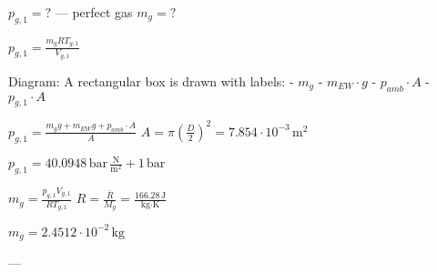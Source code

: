 \( p_{g,1} = ? \) — perfect gas  
\( m_g = ? \)  

\( p_{g,1} = \frac{m_g R T_{g,1}}{V_{g,1}} \)  

Diagram: A rectangular box is drawn with labels:  
- \( m_g \)  
- \( m_{EW} \cdot g \)  
- \( p_{amb} \cdot A \)  
- \( p_{g,1} \cdot A \)  

\( p_{g,1} = \frac{m_g g + m_{EW} g + p_{amb} \cdot A}{A} \)  
\( A = \pi \left( \frac{D}{2} \right)^2 = 7.854 \cdot 10^{-3} \, \text{m}^2 \)  

\( p_{g,1} = 40.0948 \, \text{bar} \, \frac{\text{N}}{\text{m}^2} + 1 \, \text{bar} \)  

\( m_g = \frac{p_{g,1} V_{g,1}}{R T_{g,1}} \)  
\( R = \frac{\bar{R}}{M_g} = \frac{166.28 \, \text{J}}{\text{kg} \cdot \text{K}} \)  

\( m_g = 2.4512 \cdot 10^{-2} \, \text{kg} \)  

---
